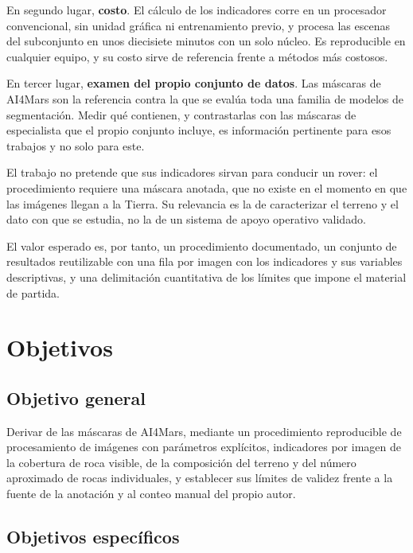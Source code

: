 En segundo lugar, \textbf{costo}. El cálculo de los indicadores corre en un procesador
convencional, sin unidad gráfica ni entrenamiento previo, y procesa las \cNEscenas{} escenas
del subconjunto en unos diecisiete minutos con un solo núcleo. Es reproducible en cualquier equipo, y su costo
sirve de referencia frente a métodos más costosos.

En tercer lugar, \textbf{examen del propio conjunto de datos}. Las máscaras de AI4Mars son la
referencia contra la que se evalúa toda una familia de modelos de segmentación. Medir qué
contienen, y contrastarlas con las máscaras de especialista que el propio conjunto incluye, es
información pertinente para esos trabajos y no solo para este.

El trabajo no pretende que sus indicadores sirvan para conducir un rover: el procedimiento
requiere una máscara anotada, que no existe en el momento en que las imágenes llegan a la
Tierra. Su relevancia es la de caracterizar el terreno y el dato con que se estudia, no la de
un sistema de apoyo operativo validado.

El valor esperado es, por tanto, un procedimiento documentado, un conjunto de resultados
reutilizable con una fila por imagen con los indicadores y sus variables descriptivas, y una delimitación cuantitativa de los límites que
impone el material de partida.

\section{Objetivos}

\subsection{Objetivo general}

Derivar de las máscaras de AI4Mars, mediante un procedimiento reproducible de procesamiento de imágenes con
parámetros explícitos, indicadores por imagen de la cobertura de roca visible, de la composición
del terreno y del número aproximado de rocas individuales, y establecer sus límites de validez
frente a la fuente de la anotación y al conteo manual del propio autor.

\subsection{Objetivos específicos}

